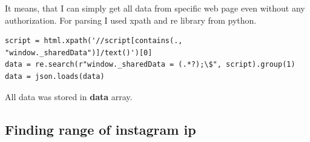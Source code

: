 It means, that I can simply get all data from specific web page even without any authorization. For parsing I used xpath and re library from python.

\begin{lstlisting}
script = html.xpath('//script[contains(., "window._sharedData")]/text()')[0]
data = re.search(r"window._sharedData = (.*?);\$", script).group(1)
data = json.loads(data)
\end{lstlisting}

All data was stored in \textbf{data} array.

\subsection{Finding range of instagram ip}
